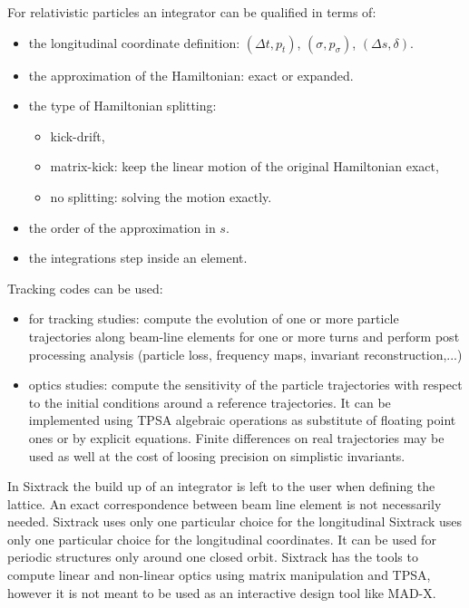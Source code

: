 \documentclass[english]{article}
\begin{document}
For relativistic particles an integrator can be qualified in terms of:
\begin{itemize}
\item the longitudinal coordinate definition:
  $(\Delta t,p_t)$,
  $(\sigma,p_\sigma)$,
  $(\Delta s, \delta)$.
\item the approximation of the Hamiltonian: exact or expanded.
\item the type of Hamiltonian splitting:
\begin{itemize}
  \item kick-drift,
  \item matrix-kick: keep the linear motion of the original Hamiltonian exact,
  \item no splitting: solving the motion exactly.
\end{itemize}
\item the order of the approximation in $s$.
\item the integrations step inside an element.
\end{itemize}

Tracking codes can be used:
\begin{itemize}
  \item for tracking studies: compute the evolution of one or more particle
    trajectories along beam-line elements for one or more turns and perform
    post processing analysis (particle loss, frequency maps, invariant
    reconstruction,...)
  \item optics studies: compute the sensitivity of the particle trajectories
    with respect to the initial conditions around a reference trajectories. It
    can be implemented using TPSA algebraic operations  as substitute of
    floating point ones or by explicit equations. Finite differences on real
trajectories may be used as well at the cost of loosing precision on
simplistic invariants.

\end{itemize}

In Sixtrack the build up of an integrator is left to the user when defining
the lattice. An exact correspondence between beam line element is not necessarily needed. Sixtrack uses only one particular choice for the longitudinal Sixtrack uses only one particular choice for the longitudinal
coordinates. It can be used for periodic structures only around one closed
orbit. Sixtrack has the tools to compute linear and non-linear optics using
matrix manipulation and TPSA, however it is not meant to be used as an
interactive design tool like MAD-X.
\end{document}
